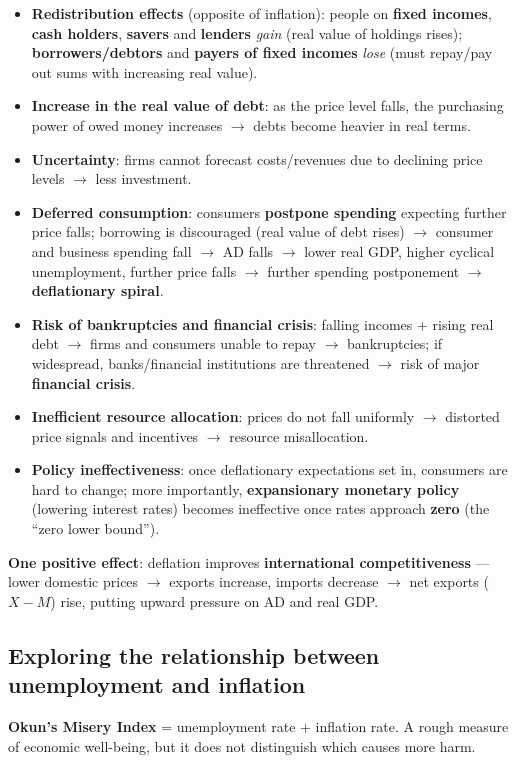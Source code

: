 \begin{itemize}
  \item \textbf{Redistribution effects} (opposite of inflation): people on \textbf{fixed incomes}, \textbf{cash holders}, \textbf{savers} and \textbf{lenders} \textit{gain} (real value of holdings rises); \textbf{borrowers/debtors} and \textbf{payers of fixed incomes} \textit{lose} (must repay/pay out sums with increasing real value).
  \item \textbf{Increase in the real value of debt}: as the price level falls, the purchasing power of owed money increases $\to$ debts become heavier in real terms.
  \item \textbf{Uncertainty}: firms cannot forecast costs/revenues due to declining price levels $\to$ less investment.
  \item \textbf{Deferred consumption}: consumers \textbf{postpone spending} expecting further price falls; borrowing is discouraged (real value of debt rises) $\to$ consumer and business spending fall $\to$ AD falls $\to$ lower real GDP, higher cyclical unemployment, further price falls $\to$ further spending postponement $\to$ \textbf{deflationary spiral}.
  \item \textbf{Risk of bankruptcies and financial crisis}: falling incomes + rising real debt $\to$ firms and consumers unable to repay $\to$ bankruptcies; if widespread, banks/financial institutions are threatened $\to$ risk of major \textbf{financial crisis}.
  \item \textbf{Inefficient resource allocation}: prices do not fall uniformly $\to$ distorted price signals and incentives $\to$ resource misallocation.
  \item \textbf{Policy ineffectiveness}: once deflationary expectations set in, consumers are hard to change; more importantly, \textbf{expansionary monetary policy} (lowering interest rates) becomes ineffective once rates approach \textbf{zero} (the ``zero lower bound'').
\end{itemize}
\textbf{One positive effect}: deflation improves \textbf{international competitiveness} --- lower domestic prices $\to$ exports increase, imports decrease $\to$ net exports ($X - M$) rise, putting upward pressure on AD and real GDP. 
\subsection{Exploring the relationship between unemployment and inflation}
\textbf{Okun's Misery Index} = unemployment rate + inflation rate. A rough measure of economic well-being, but it does not distinguish which causes more harm.\\\\
